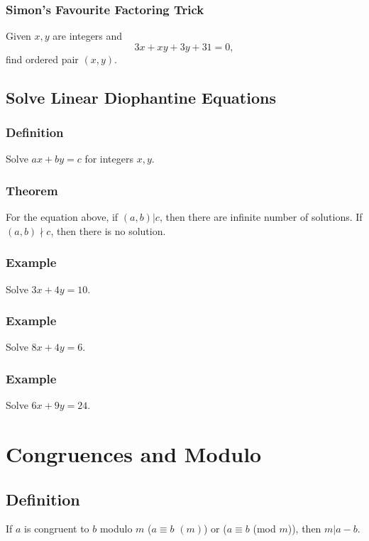 \documentclass{article}
\begin{document}
\subsubsection{Simon's Favourite Factoring Trick}
Given $x,y$ are integers and
$$3x+xy+3y+31=0,$$
find ordered pair $(x,y)$.
\vspace{60px}

\subsection{Solve Linear Diophantine Equations}
\subsubsection{Definition}

Solve $ax+by=c$ for integers $x,y$.

\subsubsection{Theorem}

For the equation above, if $(a,b)|c$, then there are infinite number of solutions. If $(a,b) \nmid c$, then there is no solution.

\subsubsection{Example}
Solve $3x+4y=10$.
\vspace{50px}

\subsubsection{Example}
Solve $8x+4y=6$.


\subsubsection{Example}
Solve $6x+9y=24$.
\vspace{50px}

\section{Congruences and Modulo}
\subsection{Definition}
If $a$ is congruent to $b$ modulo $m$ ($a \equiv b$ $(m)$) or ($a \equiv b$ (mod $m$)), then $m|a-b$.
\end{document}
